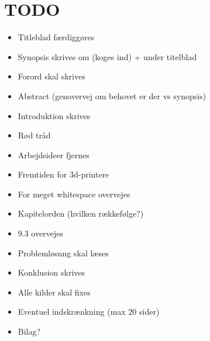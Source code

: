 \chapter{TODO} %
\label{cha:todo}

\begin{itemize}
	\item Titleblad færdiggøres
	\item Synopsis skrives om (koges ind) + under titelblad
	\item Forord skal skrives
	\item Abstract (genovervej om behovet er der vs synopsis)
	\item Introduktion skrives 
	\item Rød tråd
	\item Arbejdsideer fjernes
	\item Fremtiden for 3d-printere
	\item For meget whitespace overvejes
	\item Kapitelorden (hvilken rækkefølge?)
	\item 9.3 overvejes
	\item Problemløsnng skal læses
	\item Konklusion skrives
	\item Alle kilder skal fixes
	\item Eventuel indskrænkning (max 20 sider)
	\item Bilag?
\end{itemize}


